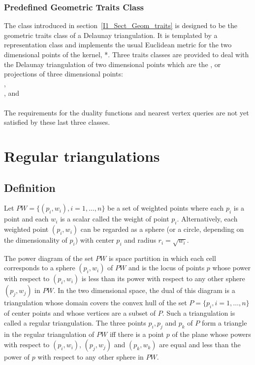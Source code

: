 \subsubsection{Predefined Geometric Traits Class}
The class 
introduced in section~\ref{I1_Sect_Geom_traits} is 
 designed to be 
the geometric traits class of a Delaunay triangulation.
It is templated by a representation class and
implements the usual Euclidean metric
for the  two dimensional points of the \cgal kernel,
*.
Three traits classes are provided to deal with
the Delaunay triangulation of two dimensional points which are
the ,  or  projections of three dimensional points:\\
,\\
, and\\
 \\
The requirements for the duality functions and nearest vertex
queries are not yet satisfied by
these last three classes.


\section{Regular triangulations}
\label{I1_Sect_Regular}
 
\subsection{Definition}
Let ${  PW} = \{(p_i, w_i), i = 1, \ldots , n \}$ be a set of 
weighted points where each $p_i$ is a point and each $w_i$
is a scalar called the weight of point $p_i$.
Alternatively, each weighted point $(p_i, w_i)$ can be regarded
as a sphere (or a circle, depending on the dimensionality
of $p_i$)  with center $p_i$ and radius $r_i=\sqrt{w_i}$.

The power diagram of the set ${  PW}$ is space partition in which
 each cell corresponds to a sphere $(p_i, w_i)$ of ${  PW}$
and is the locus of points  $p$ whose power with respect to $(p_i, w_i)$
is less than its power with respect to any other sphere $(p_j, w_j)$
in ${  PW}$. In the two dimensional space,
the dual of this diagram is a triangulation 
whose domain covers the convex hull of the set 
${  P}= \{ p_i, i = 1, \ldots , n \}$ of center points
and whose vertices are a subset of ${  P}$.
Such a triangulation is called a regular triangulation.
The  three points $p_i, p_j$ and $p_k$ of ${  P}$
form a triangle in the regular triangulation of ${  PW}$
iff there is a point $p$ of the plane whose
powers with respect to $(p_i, w_i)$, $(p_j, w_j)$
and $(p_k, w_k)$ are equal and less than the power of $p$
with respect to any other sphere in  ${  PW}$.

